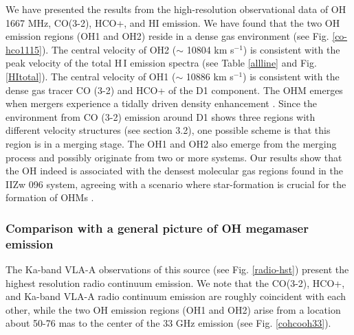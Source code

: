 \documentclass[]{aa} %
\newcommand{\kms}{km s$^{-1}$\xspace}
\newcommand{\HI}{{\rm H\,{\scriptsize I}}\xspace}
\begin{document}
We have presented the results from the high-resolution observational data of OH 1667 MHz, CO(3-2), HCO+, and HI emission.
We have found that the two OH emission regions (OH1 and OH2) reside in a dense gas environment (see Fig. \ref{co-hco1115}).
The central velocity of OH2 ($\sim$ 10804 \kms) is consistent with the peak velocity of the total \HI emission spectra (see Table \ref{allline} and Fig. \ref{HItotal}).
The central velocity of OH1 ($\sim$ 10886 \kms) is consistent with the dense gas tracer CO (3-2) and HCO+ of the D1 component. The OHM emerges when mergers experience a tidally driven density enhancement \citep{2007ApJ...669L...9D}.  Since the environment from CO (3-2) emission around D1 shows three regions with different velocity structures (see section 3.2), one possible scheme is that this region is in a merging stage. The OH1 and OH2 also emerge from the merging process and possibly originate from two or more systems. Our results show that the OH indeed is associated with the densest molecular gas regions found in the IIZw 096 system, agreeing with a scenario where star-formation is crucial for the formation of OHMs \citep{2005ARA&A..43..625L}.


\subsubsection{Comparison with a general picture of OH megamaser emission}

The Ka-band VLA-A observations of this source (see Fig. \ref{radio-hst}) present the highest resolution radio continuum emission. We note that the CO(3-2), HCO+, and Ka-band VLA-A radio continuum emission are roughly coincident with each other, while the two OH emission regions (OH1 and OH2) arise from a location about 50-76 mas to the center of the 33 GHz emission (see Fig. \ref{cohcooh33}).
\end{document}
